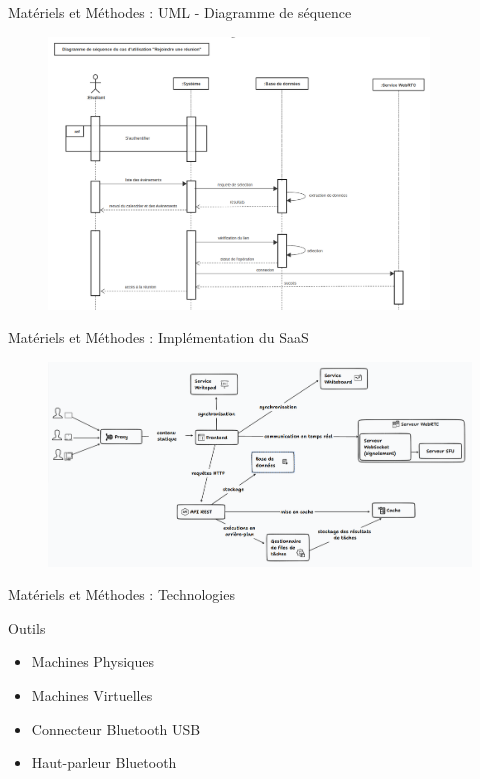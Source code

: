 \documentclass{beamer}
\begin{document}
\begin{frame}{Matériels et Méthodes : \small{UML} - \footnotesize{Diagramme de séquence}}
  \begin{figure}[H]
    \centering
    \includegraphics[width=0.9\textwidth]{../../images/join-meet-sequence-diag.png}
\end{figure}
\end{frame}

\begin{frame}{Matériels et Méthodes : \small{Implémentation du SaaS}}
  \begin{figure}[H]
    \centering
    \includegraphics[width=\textwidth]{../images/studx-system-design}
\end{figure}
\end{frame}

\begin{frame}{Matériels et Méthodes : \small{Technologies}}
  \begin{block}{Outils}
    \begin{itemize}
      \item Machines Physiques
      \item Machines Virtuelles
      \item Connecteur Bluetooth USB
      \item Haut-parleur Bluetooth
    \end{itemize}
  \end{block}
\end{frame}
\end{document}
